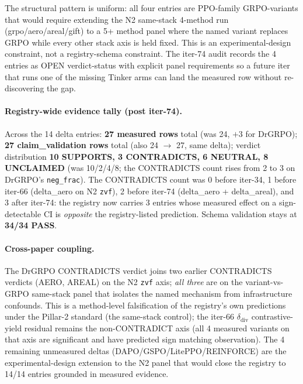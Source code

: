 The structural pattern is uniform: all four entries are PPO-family
GRPO-variants that would require extending the N2 same-stack 4-method
run (grpo/aero/areal/gift) to a 5+ method panel where the named
variant replaces GRPO while every other stack axis is held fixed.
This is an experimental-design constraint, not a registry-schema
constraint. The iter-74 audit records the 4 entries as OPEN
verdict-status with explicit panel requirements so a future iter that
runs one of the missing Tinker arms can land the measured row
without re-discovering the gap.

\paragraph{Registry-wide evidence tally (post iter-74).}
Across the 14 delta entries: \textbf{27 measured rows} total (was
24, $+3$ for DrGRPO); \textbf{27 claim\_validation rows} total
(also 24 $\to$ 27, same delta); verdict distribution
\textbf{10 SUPPORTS, 3 CONTRADICTS, 6 NEUTRAL, 8 UNCLAIMED}
(was 10/2/4/8; the CONTRADICTS count rises from 2 to 3 on DrGRPO's
\texttt{neg\_frac}). The CONTRADICTS count was 0 before iter-34,
1 before iter-66 (delta\_aero on N2 \texttt{zvf}), 2 before iter-74
(delta\_aero + delta\_areal), and 3 after iter-74: the registry now
carries 3 entries whose measured effect on a sign-detectable CI is
\emph{opposite} the registry-listed prediction. Schema validation
stays at \textbf{34/34 PASS}.

\paragraph{Cross-paper coupling.}
The DrGRPO CONTRADICTS verdict joins two earlier CONTRADICTS verdicts
(AERO, AREAL) on the N2 \texttt{zvf} axis; \emph{all three} are
on the variant-vs-GRPO same-stack panel that isolates the named
mechanism from infrastructure confounds. This is a method-level
falsification of the registry's own predictions under the
Pillar-2 standard (the same-stack control); the iter-66
$\delta_{\text{div}}$ contrastive-yield residual remains the
non-CONTRADICT axis (all 4 measured variants on that axis are
significant and have predicted sign matching observation).
The 4 remaining unmeasured deltas (DAPO/GSPO/LitePPO/REINFORCE)
are the experimental-design extension to the N2 panel that would
close the registry to 14/14 entries grounded in measured evidence.

